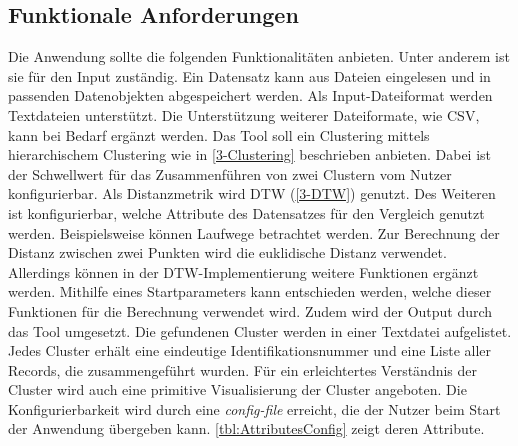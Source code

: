 \subsection{Funktionale Anforderungen}
\label{4-FunktionaleAnforderungen}
Die Anwendung sollte die folgenden Funktionalitäten anbieten.
Unter anderem ist sie für den Input zuständig.
Ein Datensatz kann aus Dateien eingelesen und in passenden Datenobjekten abgespeichert werden.
Als Input-Dateiformat werden Textdateien unterstützt.
Die Unterstützung weiterer Dateiformate, wie CSV, kann bei Bedarf ergänzt werden.
Das Tool soll ein Clustering mittels hierarchischem Clustering wie in \autoref{3-Clustering} beschrieben anbieten.
Dabei ist der Schwellwert für das Zusammenführen von zwei Clustern vom Nutzer konfigurierbar.
Als Distanzmetrik wird \ac{DTW} (\autoref{3-DTW}) genutzt.
Des Weiteren ist konfigurierbar, welche Attribute des Datensatzes für den Vergleich genutzt werden.
Beispielsweise können Laufwege betrachtet werden.
Zur Berechnung der Distanz zwischen zwei Punkten wird die euklidische Distanz verwendet.
Allerdings können in der \ac*{DTW}-Implementierung weitere Funktionen ergänzt werden.
Mithilfe eines Startparameters kann entschieden werden, welche dieser Funktionen für die Berechnung verwendet wird.
Zudem wird der Output durch das Tool umgesetzt.
Die gefundenen Cluster werden in einer Textdatei aufgelistet.
Jedes Cluster erhält eine eindeutige Identifikationsnummer und eine Liste aller Records, die zusammengeführt wurden.
Für ein erleichtertes Verständnis der Cluster wird auch eine primitive Visualisierung der Cluster angeboten.
Die Konfigurierbarkeit wird durch eine \emph{config-file} erreicht,
die der Nutzer beim Start der Anwendung übergeben kann.
\autoref{tbl:AttributesConfig} zeigt deren Attribute.
